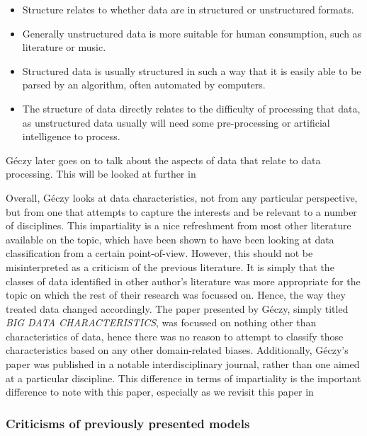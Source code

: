 \documentclass[a4paper,11pt]{article}
\begin{document}
\begin{itemize}
  \item Structure relates to whether data are in structured or unstructured formats.
  \item Generally unstructured data is more suitable for human consumption, such as literature or music.
  \item Structured data is usually structured in such a way that it is easily able to be parsed by an algorithm, often
  automated by computers.
  \item The structure of data directly relates to the difficulty of processing that data, as unstructured data usually
  will need some pre-processing or artificial intelligence to process.
\end{itemize}

G\'eczy later goes on to talk about the aspects of data that relate to data processing. This will be looked at further
in~\sectref{} %

Overall, G\'eczy looks at data characteristics, not from any particular perspective, but from one that attempts to capture
the interests and be relevant to a number of disciplines. This impartiality is a nice refreshment from most other literature
available on the topic, which have been shown to have been looking at data classification from a certain point-of-view.
However, this should not be misinterpreted as a criticism of the previous literature. It is simply that the classes of
data identified in other author's literature was more appropriate for the topic on which the rest of their research was
focussed on. Hence, the way they treated data changed accordingly. The paper presented by G\'eczy, simply titled
\emph{BIG DATA CHARACTERISTICS}, was focussed on nothing other than characteristics of data, hence there was no reason
to attempt to classify those characteristics based on any other domain-related biases. Additionally, G\'eczy's paper was
published in a notable interdisciplinary journal, rather than one aimed at a particular discipline. This difference in
terms of impartiality is the important difference to note with this paper, especially as we revisit this paper in~\sectref{} %



\subsubsection{Criticisms of previously presented models} %
\label{ssub:criticisms_of_previously_presented_models}
\end{document}

